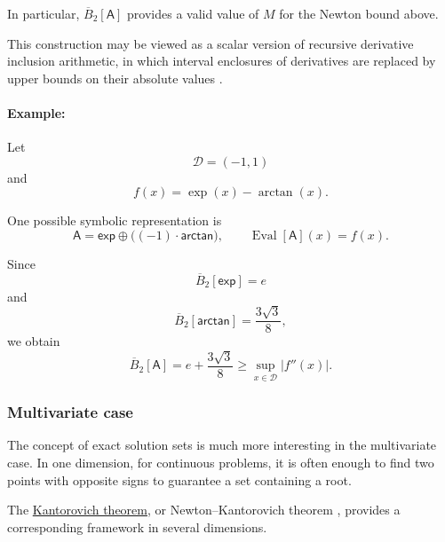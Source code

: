 \documentclass{article}
\theoremstyle{definition}
\begin{document}
In particular, $\overline{B}_2[\mathsf{A}]$ provides a valid value of
$M$ for the Newton bound above.

This construction may be viewed as a scalar version of recursive derivative inclusion arithmetic, in which interval enclosures of derivatives are replaced by upper bounds on their absolute values \cite[Sec.~2.2]{book:IntervalNeumaier1991}.

\paragraph{Example:}

Let
\begin{equation}
    \mathcal{D}=(-1,1)
\end{equation}
and
\begin{equation}
    f(x)=\exp(x)-\arctan(x).
\end{equation}

One possible symbolic representation is
\begin{equation}
    \mathsf{A}
    =
    \mathsf{exp}
    \oplus
    \bigl(
        (-1)\cdot\mathsf{arctan}
    \bigr),
    \qquad
    \operatorname{Eval}[\mathsf{A}](x)
    =
    f(x).
\end{equation}

Since
\begin{equation}
    \overline{B}_2[\mathsf{exp}]
    =
    e
\end{equation}
and
\begin{equation}
    \overline{B}_2[\mathsf{arctan}]
    =
    \frac{3\sqrt{3}}{8},
\end{equation}
we obtain
\begin{equation}
    \overline{B}_2[\mathsf{A}]
    =
    e+\frac{3\sqrt{3}}{8}
    \geq
    \sup_{x\in\mathcal{D}}
    |f''(x)|.
\end{equation}


\subsubsection{Multivariate case}

The concept of exact solution sets is much more interesting in the
multivariate case. In one dimension, for continuous problems, it is
often enough to find two points with opposite signs to guarantee a set
containing a root.

The
\href{https://en.wikipedia.org/wiki/Kantorovich_theorem}
{Kantorovich theorem},
or Newton--Kantorovich theorem \cite{paper:Ortega1968},
provides a corresponding framework in several dimensions.
\end{document}
